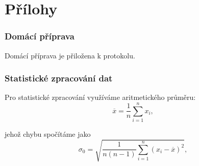 \documentclass[english]{article}
\begin{document}
\part{Přílohy}

\section{Domácí příprava}
	Domácí příprava je přiložena k protokolu.
\section{Statistické zpracování dat}
	Pro statistické zpracování využíváme aritmetického průměru:
	\begin{equation} \label{eq:aritmeticky_prumer}
	\overline{x} = \frac{1}{n}\sum\limits_{i=1}^{n}x_i,
	\end{equation}
	
	jehož chybu spočítáme jako 
	\begin{equation} \label{eq:chyba_aritmetickeho_prumeru}
	\sigma_0 = \sqrt{\frac{1}{n(n-1)} \sum\limits_{i=1}^{n}\left( x_i - \overline{x} \right)^2 },
	\end{equation}
	
\end{document}
